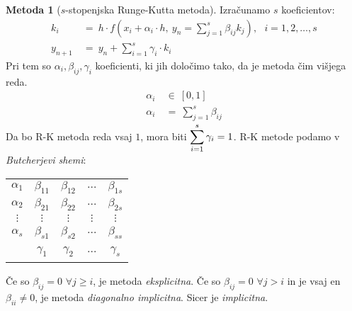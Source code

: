 \documentclass[11pt]{article}
\theoremstyle{definition}
\theoremstyle{definition}
\newtheorem*{metoda}{Metoda}
\begin{document}
\begin{metoda}[$s$-stopenjska Runge-Kutta metoda]

Izračunamo $s$ koeficientov:
\begin{align*}
k_i ~&=~ h \cdot f(x_i + \alpha_i \cdot h, ~y_n = \sum_{j=1}^s \beta_{ij} k_j), ~~~i = 1, 2, \ldots, s \\
y_{n+1} ~&=~ y_n + \sum_{i=1}^s \gamma_i \cdot k_i
\end{align*}
Pri tem so $\alpha_i, \beta_{ij}, \gamma_i$ koeficienti, ki jih določimo tako, da je metoda čim višjega reda.
\begin{align*}
\alpha_i ~&\in~ [0, 1] \\
\alpha_i ~&=~ \sum_{j=1}^s \beta_{ij}
\end{align*}
Da bo R-K metoda reda vsaj $1$, mora biti $\mathlarger{\sum_{i=1}^s \gamma_i = 1}$.
R-K metode podamo v \textit{Butcherjevi shemi}: \\
\begin{center}
\begin{tabular}{c|cccc}
$\alpha_1$ & $\beta_{11}$ & $\beta_{12}$ & $\ldots$ & $\beta_{1s}$ \\
$\alpha_2$ & $\beta_{21}$ & $\beta_{22}$ & $\ldots$ & $\beta_{2s}$ \\
$\vdots$ & $\vdots$ & $\vdots$ & $\vdots$ & $\vdots$ \\ 
$\alpha_s$ & $\beta_{s1}$ & $\beta_{s2}$ & $\ldots$ & $\beta_{ss}$ \\ \hline
~ & $\gamma_1$ & $\gamma_2$ & $\ldots$ & $\gamma_s$
\end{tabular}
\end{center}
Če so $\beta_{ij} = 0$ $\forall j \geq i$, je metoda \textit{eksplicitna}. Če so $\beta_{ij} = 0$ $\forall j > i$ in je vsaj en $\beta_{ii} \neq 0$, je metoda \textit{diagonalno implicitna}. Sicer je \textit{implicitna}.

\end{metoda}
\vspace{0.5cm}
\end{document}
